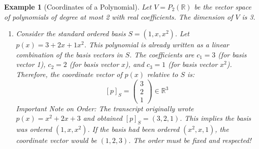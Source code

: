 \documentclass[11pt, letterpaper]{article}
\theoremstyle{mytheoremstyle}
\theoremstyle{mydefinitionstyle}
\newtheorem{example}[theorem]{Example}
\theoremstyle{myremarkstyle}
\newcommand{\R}{\mathbb{R}}
\newcommand{\mat}[1]{\begin{pmatrix}#1\end{pmatrix}} %
\newcommand{\coord}[2]{[#1]_{#2}} %
\begin{document}
\begin{example}[Coordinates of a Polynomial]
Let $V = P_2(\R)$ be the vector space of polynomials of degree at most 2 with real coefficients. The dimension of $V$ is 3.
\begin{enumerate}
    \item Consider the \emph{standard ordered basis} $S = (1, x, x^2)$. Let $p(x) = 3 + 2x + 1x^2$.
    This polynomial is already written as a linear combination of the basis vectors in $S$. The coefficients are $c_1=3$ (for basis vector 1), $c_2=2$ (for basis vector $x$), and $c_3=1$ (for basis vector $x^2$).
    Therefore, the coordinate vector of $p(x)$ relative to $S$ is:
    \[ \coord{p}{S} = \mat{3 \\ 2 \\ 1} \in \R^3 \]
    \emph{Important Note on Order:} The transcript originally wrote $p(x)=x^2+2x+3$ and obtained $\coord{p}{S}=(3,2,1)$. This implies the basis was ordered $(1, x, x^2)$. If the basis had been ordered $(x^2, x, 1)$, the coordinate vector would be $(1, 2, 3)$. The order must be fixed and respected!


\end{enumerate}
\end{example}
\end{document}

